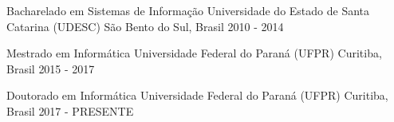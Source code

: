 

\begin{cventries}

  \cventry
    {Bacharelado em Sistemas de Informação} %
    {Universidade do Estado de Santa Catarina (UDESC)} %
    {São Bento do Sul, Brasil} %
    {2010 - 2014} %
    {
    }

  \cventry
	{Mestrado em Informática} %
	{Universidade Federal do Paraná (UFPR)} %
	{Curitiba, Brasil} %
	{2015 - 2017} %
	{		
	}
	

  \cventry
	{Doutorado em Informática} %
	{Universidade Federal do Paraná (UFPR)} %
	{Curitiba, Brasil} %
	{2017 - PRESENTE} %
	{	
	}

\end{cventries}
